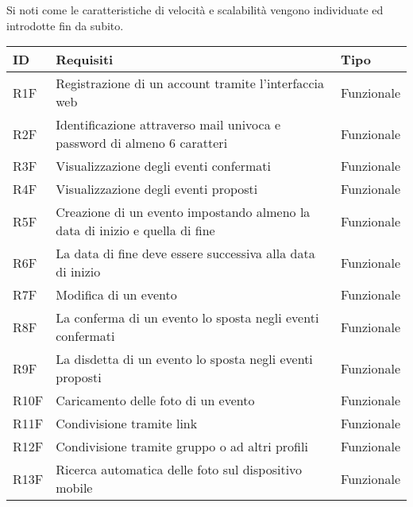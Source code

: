 Si noti come le caratteristiche di velocità e scalabilità vengono individuate ed introdotte fin da subito.
\begin{table}
    \begin{tabular} {|P{1.3cm}|P{11.2cm}|P{3cm}|}
        \hline
        \textbf{ID} & \textbf{Requisiti}                                                          & \textbf{Tipo}  \\
        \hline
        R1F         & Registrazione di un account tramite l’interfaccia web                       & Funzionale     \\
        \hline
        R2F         & Identificazione attraverso mail univoca e password di almeno 6 caratteri    & Funzionale     \\
        \hline
        R3F         & Visualizzazione degli eventi confermati                                     & Funzionale     \\
        \hline
        R4F         & Visualizzazione degli eventi proposti                                       & Funzionale     \\
        \hline
        R5F         & Creazione di un evento impostando almeno la data di inizio e quella di fine & Funzionale     \\
        \hline
        R6F         & La data di fine deve essere successiva alla data di inizio                  & Funzionale     \\
        \hline
        R7F         & Modifica di un evento                                                       & Funzionale     \\
        \hline
        R8F         & La conferma di un evento lo sposta negli eventi confermati                  & Funzionale     \\
        \hline
        R9F         & La disdetta di un evento lo sposta negli eventi proposti                    & Funzionale     \\
        \hline
        R10F        & Caricamento delle foto di un evento                                         & Funzionale     \\
        \hline
        R11F        & Condivisione tramite link                                                   & Funzionale     \\
        \hline
        R12F        & Condivisione tramite gruppo o ad altri profili                              & Funzionale     \\
        \hline
        R13F        & Ricerca automatica delle foto sul dispositivo mobile                        & Funzionale     \\

\end{tabular}
\end{table}
